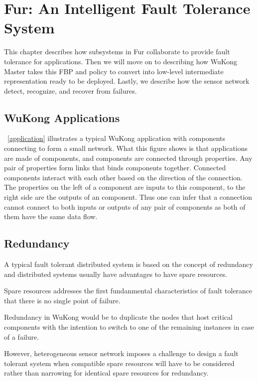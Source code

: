 \chapter{Fur: An Intelligent Fault Tolerance System}
\label{c:fur}

This chapter describes how subsystems in Fur collaborate to provide fault tolerance
for applications. Then we will move 
on to describing how WuKong Master takes this FBP and policy to convert into 
low-level intermediate representation ready to be deployed. Lastly, we 
describe how the sensor network detect, recognize, and recover from failures.

\section{WuKong Applications}

~\ref{application} illustrates a typical WuKong application with components
connecting to form a small network. What this figure shows is that applications
are made of components, and components are connected through properties.
Any pair of properties form links that binds components together. Connected
components interact with each other based on the direction of the connection.
The properties on the left of a component are inputs to this component, to the
right side are the outputs of an component. Thus one can infer that
a connection cannot connect to both inputs or outputs of any pair of components
as both of them have the same data flow.

\section{Redundancy}

A typical fault tolerant distributed system is based on the concept of
redundancy and distributed systems usually have advantages to have spare
resources.

Spare resources addresses the first fundanmental characteristics of fault
tolerance that there is no single point of failure.

Redundancy in WuKong would be to duplicate the nodes that host critical
components with the intention to switch to one of the remaining
instances in case of a failure.

However, heterogeneous sensor network imposes a challenge to design a fault
tolerant system when compatible spare resources will have to be considered rather
than narrowing for identical spare resources for redundancy.

